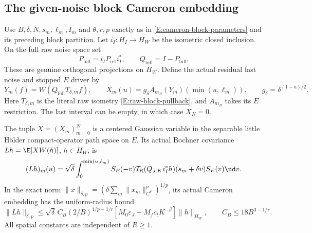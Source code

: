 \subsection{The given-noise block Cameron embedding}

Use $B,\delta,N,s_m,\ell_m,I_m$ and $\theta,r,p$ exactly as in
\eqref{E:cameron-block-parameters} and its preceding block partition.
Let $i_I:H_I\to H_W$ be the isometric closed inclusion.
On the full raw noise space set
\[
  P_{\mathrm{full}}=i_IP_{\mathrm{ret}}i_I^*,\qquad
  Q_{\mathrm{full}}=I-P_{\mathrm{full}} .
\]
These are genuine orthogonal projections on $H_W$.
Define the actual residual fast noise and stopped $E$ driver by
\begin{equation}\label{E:uniform-actual-residual}
  Y_m(f)=W(Q_{\mathrm{full}}T_{\delta,m}f),\qquad
  X_m(u)=g_\delta A_{m_R}(Y_m)(\min(u,\ell_m)),\qquad
  g_\delta=\delta^{(1-a)/2}.
\end{equation}
Here $T_{\delta,m}$ is the literal raw isometry
\eqref{E:raw-block-pullback}, and $A_{m_R}$ takes its $E$ restriction.
The last interval can be empty, in which case $X_N=0$.

\begin{proposition}
  \label{P:uniform-actual-cameron}
  The tuple $X=(X_m)_{m=0}^N$ is a centered Gaussian variable in
  the separable little H\"older compact-operator path space on $E$.
  Its actual Bochner covariance $Lh=\E[XW(h)]$, $h\in H_W$, is
  \begin{equation}\label{E:uniform-actual-covariance}
    (Lh)_m(u)=\sqrt\delta\int_0^{\min(u,\ell_m)}
    S_E(-v)\mathcal T_R(Q_{J,K}i_I^*h)(s_m+\delta v)
    S_E(v)\ud v .
  \end{equation}
  In the exact norm
  $\|x\|_{\delta,p}=(\delta\sum_m\|x_m\|_{C^\theta}^p)^{1/p}$,
  its actual Cameron embedding has the uniform-radius bound
  \begin{equation}\label{E:uniform-actual-cameron-bound}
    \|Lh\|_{\delta,p}
    \le\sqrt\delta\,C_B(2/B)^{1/p-1/r}
    [M_0\varepsilon_J+M_fc_tK^{-\beta}]\|h\|_{H_W},
    \qquad C_B\le18B^{3-1/r}.
  \end{equation}
  All spatial constants are independent of $R\ge1$.
\end{proposition}

